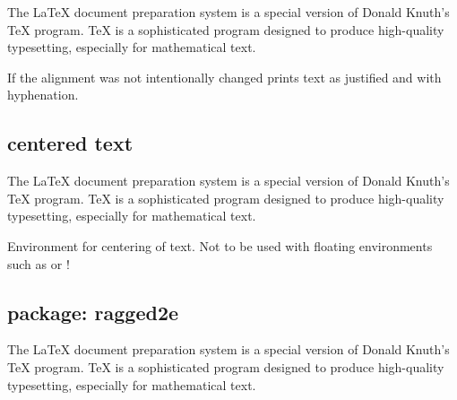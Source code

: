 \begin{filecontents*}{\democodefile}
The \LaTeX{} document preparation 
system is a special version of Donald
Knuth's \TeX{} program. \TeX{} is a 
sophisticated program designed to 
produce high-quality typesetting, 
especially for mathematical text.
\end{filecontents*}

%
If the alignment was not intentionally changed \latex{} prints text as justified and with hyphenation.

\subsection{centered text}
%
\begin{filecontents*}{\democodefile}
\begin{center}
The \LaTeX{} document preparation 
system is a special version of Donald
Knuth's \TeX{} program. \TeX{} is a 
sophisticated program designed to 
produce high-quality typesetting, 
especially for mathematical text.
\end{center}
\end{filecontents*}
%
Environment for centering of text. Not to be used with floating environments such as  or !


\subsection{package: ragged2e}

%
\begin{filecontents*}{\democodefile}
\begin{FlushLeft}
The \LaTeX{} document preparation 
system is a special version of Donald
Knuth's \TeX{} program. \TeX{} is a 
sophisticated program designed to 
produce high-quality typesetting, 
especially for mathematical text.
\end{FlushLeft}
\end{filecontents*}


